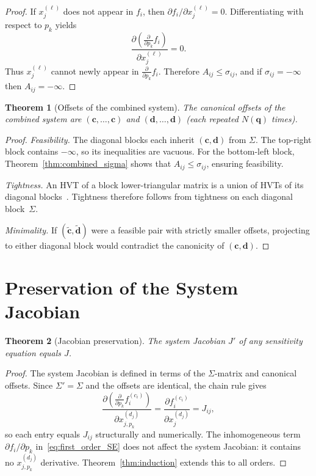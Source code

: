 \documentclass[12pt,a4paper]{article}
\theoremstyle{definition}
\theoremstyle{plain}
\newtheorem{theorem}{Theorem}[section]
\theoremstyle{remark}
\newcommand{\vq}{\mathbf{q}}
\newcommand{\vc}{\mathbf{c}}
\newcommand{\vd}{\mathbf{d}}
\begin{document}
\begin{proof}
If $x_j^{(\ell)}$ does not appear in $f_i$, then $\partial f_i/\partial x_j^{(\ell)} = 0$. Differentiating with respect to $p_k$ yields
\[
\frac{\partial (\frac{\partial}{\partial p_k} f_i)}{\partial x_j^{(\ell)}} = 0 .
\]
Thus $x_j^{(\ell)}$ cannot newly appear in $\frac{\partial}{\partial p_k} f_i$. Therefore $A_{ij} \le \sigma_{ij}$, and if $\sigma_{ij} = -\infty$ then $A_{ij} = -\infty$.
\end{proof}

\begin{theorem}[Offsets of the combined system]
\label{thm:canonical}
The canonical offsets of the combined system are $(\vc,\dots,\vc)$ and $(\vd,\dots,\vd)$ (each repeated $N(\vq)$ times).
\end{theorem}

\begin{proof}
\textit{Feasibility.} The diagonal blocks each inherit $(\vc,\vd)$ from $\Sigma$. The top-right block contains $-\infty$, so its inequalities are vacuous. For the bottom-left block, Theorem~\ref{thm:combined_sigma} shows that $A_{ij}\le\sigma_{ij}$, ensuring feasibility.

\textit{Tightness.} An HVT of a block lower-triangular matrix is a union of HVTs of its diagonal blocks~\cite{golub2013matrix}. Tightness therefore follows from tightness on each diagonal block~$\Sigma$.

\textit{Minimality.} If $(\tilde{\vc},\tilde{\vd})$ were a feasible pair with strictly smaller offsets, projecting to either diagonal block would contradict the canonicity of $(\vc,\vd)$.
\end{proof}

\section{Preservation of the System Jacobian}

\begin{theorem}[Jacobian preservation]
\label{thm:jacobian}
The system Jacobian $J'$ of any sensitivity equation equals $J$.
\end{theorem}

\begin{proof}
The system Jacobian is defined in terms of the $\Sigma$-matrix and canonical offsets. Since $\Sigma'=\Sigma$ and the offsets are identical, the chain rule gives
\[
  \frac{\partial(\frac{\partial}{\partial p_k}f_i^{(c_i)})}{\partial x_{j,p_k}^{(d_j)}}
  = \frac{\partial f_i^{(c_i)}}{\partial x_j^{(d_j)}} = J_{ij},
\]
so each entry equals $J_{ij}$ structurally and numerically. The inhomogeneous term $\partial f_i/\partial p_k$ in~\eqref{eq:first_order_SE} does not affect the system Jacobian: it contains no $x_{j,p_k}^{(d_j)}$ derivative. Theorem~\ref{thm:induction} extends this to all orders.
\end{proof}
\end{document}
